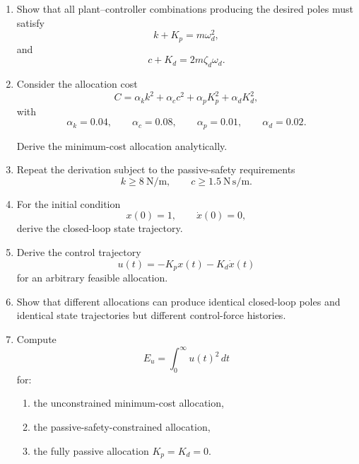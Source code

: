 \begin{enumerate}
    \item Show that all plant--controller combinations producing the desired
    poles must satisfy
    \begin{equation}
    k+K_p=m\omega_d^2,
    \end{equation}
    and
    \begin{equation}
    c+K_d=2m\zeta_d\omega_d.
    \end{equation}

    \item Consider the allocation cost
    \begin{equation}
    C
    =
    \alpha_k k^2
    +
    \alpha_c c^2
    +
    \alpha_p K_p^2
    +
    \alpha_d K_d^2,
    \end{equation}
    with
    \begin{equation}
    \alpha_k=0.04,
    \qquad
    \alpha_c=0.08,
    \qquad
    \alpha_p=0.01,
    \qquad
    \alpha_d=0.02.
    \end{equation}

    Derive the minimum-cost allocation analytically.

    \item Repeat the derivation subject to the passive-safety requirements
    \begin{equation}
    k\geq8~\mathrm{N/m},
    \qquad
    c\geq1.5~\mathrm{N\,s/m}.
    \end{equation}

    \item For the initial condition
    \begin{equation}
    x(0)=1,
    \qquad
    \dot{x}(0)=0,
    \end{equation}
    derive the closed-loop state trajectory.

    \item Derive the control trajectory
    \begin{equation}
    u(t)=-K_px(t)-K_d\dot{x}(t)
    \end{equation}
    for an arbitrary feasible allocation.

    \item Show that different allocations can produce identical
    closed-loop poles and identical state trajectories but different
    control-force histories.

    \item Compute
    \begin{equation}
    E_u
    =
    \int_0^\infty u(t)^2\,dt
    \end{equation}
    for:
    \begin{enumerate}
        \item the unconstrained minimum-cost allocation,
        \item the passive-safety-constrained allocation,
        \item the fully passive allocation $K_p=K_d=0$.
    \end{enumerate}


\end{enumerate}
